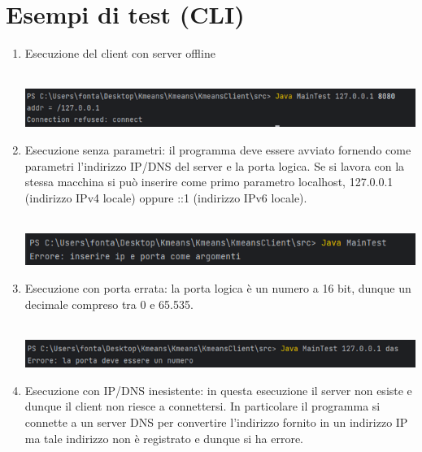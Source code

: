 \section{Esempi di test (CLI)}
\begin{enumerate}
  \item Esecuzione del client con server offline \\ \\
  \begin{minipage}[t]{0.3\textwidth}
    \includegraphics[scale=0.8]{img/test1.png}
  \end{minipage}
  \item Esecuzione senza parametri: il programma deve essere avviato fornendo come parametri l'indirizzo IP/DNS del server e la porta logica. Se si lavora con la stessa macchina si può inserire come primo parametro localhost, 127.0.0.1 (indirizzo IPv4 locale) oppure ::1 (indirizzo IPv6 locale). \\ \\
  \begin{minipage}[t]{0.3\textwidth}
    \includegraphics[scale=0.8]{img/test2.png}
  \end{minipage}
  \item Esecuzione con porta errata: la porta logica è un numero a 16 bit, dunque un decimale compreso tra 0 e 65.535. \\ \\
  \begin{minipage}[t]{0.3\textwidth}
    \includegraphics[scale=0.8]{img/test3.png}
  \end{minipage}
  \item Esecuzione con IP/DNS inesistente: in questa esecuzione il server non esiste e dunque il client non riesce a connettersi. In particolare il programma si connette a un server DNS per convertire l'indirizzo fornito in un indirizzo IP ma tale indirizzo non è registrato e dunque si ha errore. \\ \\
  \begin{minipage}[t]{0.3\textwidth}

\end{minipage}
\end{enumerate}
